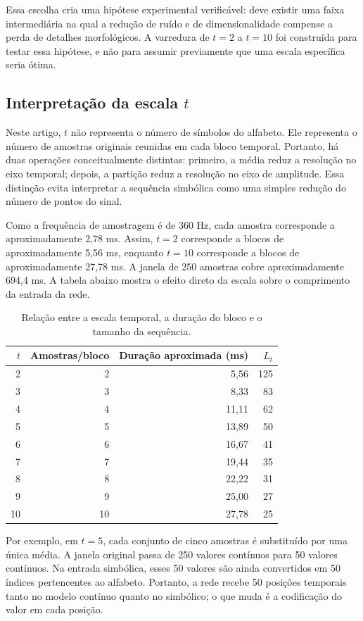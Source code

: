 \documentclass[12pt,a4paper]{article}
\begin{document}
Essa escolha cria uma hipótese experimental verificável: deve existir uma faixa intermediária na qual a redução de ruído e de dimensionalidade compense a perda de detalhes morfológicos. A varredura de $t=2$ a $t=10$ foi construída para testar essa hipótese, e não para assumir previamente que uma escala específica seria ótima.

\subsection{Interpretação da escala $t$}

Neste artigo, $t$ não representa o número de símbolos do alfabeto. Ele representa o número de amostras originais reunidas em cada bloco temporal. Portanto, há duas operações conceitualmente distintas: primeiro, a média reduz a resolução no eixo temporal; depois, a partição reduz a resolução no eixo de amplitude. Essa distinção evita interpretar a sequência simbólica como uma simples redução do número de pontos do sinal.

Como a frequência de amostragem é de 360 Hz, cada amostra corresponde a aproximadamente 2,78 ms. Assim, $t=2$ corresponde a blocos de aproximadamente 5,56 ms, enquanto $t=10$ corresponde a blocos de aproximadamente 27,78 ms. A janela de 250 amostras cobre aproximadamente 694,4 ms. A tabela abaixo mostra o efeito direto da escala sobre o comprimento da entrada da rede.

\begin{table}[H]
\centering
\caption{Relação entre a escala temporal, a duração do bloco e o tamanho da sequência.}
\label{tab:escalas_temporais}
\small
\begin{tabular}{rrrr}
\toprule
$t$ & Amostras/bloco & Duração aproximada (ms) & $L_t$ \\
\midrule
2 & 2 & 5,56 & 125 \\
3 & 3 & 8,33 & 83 \\
4 & 4 & 11,11 & 62 \\
5 & 5 & 13,89 & 50 \\
6 & 6 & 16,67 & 41 \\
7 & 7 & 19,44 & 35 \\
8 & 8 & 22,22 & 31 \\
9 & 9 & 25,00 & 27 \\
10 & 10 & 27,78 & 25 \\
\bottomrule
\end{tabular}
\end{table}

Por exemplo, em $t=5$, cada conjunto de cinco amostras é substituído por uma única média. A janela original passa de 250 valores contínuos para 50 valores contínuos. Na entrada simbólica, esses 50 valores são ainda convertidos em 50 índices pertencentes ao alfabeto. Portanto, a rede recebe 50 posições temporais tanto no modelo contínuo quanto no simbólico; o que muda é a codificação do valor em cada posição.
\end{document}
